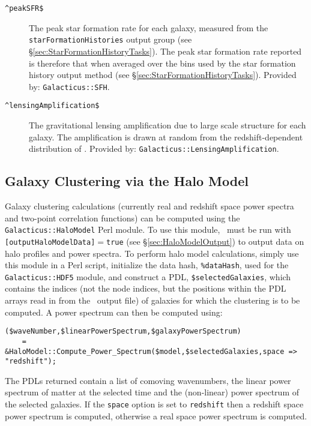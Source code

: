 \begin{description}
 \item[{\tt \textasciicircum peakSFR\$}] The peak star formation rate for each galaxy, measured from the {\tt starFormationHistories} output group  (see \S\ref{sec:StarFormationHistoryTasks}). The peak star formation rate reported is therefore that when averaged over the bins used by the star formation history output method (see \S\ref{sec:StarFormationHistoryTasks}). Provided by: {\tt Galacticus::SFH}.
 \item[{\tt \textasciicircum lensingAmplification\$}] The gravitational lensing amplification due to large scale structure for each galaxy. The amplification is drawn at random from the redshift-dependent distribution of \cite{takahashi_probability_2011}. Provided by: {\tt Galacticus::LensingAmplification}.
\end{description}

\subsection{Galaxy Clustering via the Halo Model}\label{sec:ClusteringHaloModel}

Galaxy clustering calculations (currently real and redshift space power spectra and two-point correlation functions) can be computed using the {\tt Galacticus::HaloModel} Perl module. To use this module, \glc\ must be run with {\tt [outputHaloModelData]}$=${\tt true} (see \S\ref{sec:HaloModelOutput}) to output data on halo profiles and power spectra. To perform halo model calculations, simply use this module in a Perl script, initialize the data hash, {\tt \%dataHash}, used for the {\tt Galacticus::HDF5} module, and construct a PDL, {\tt \$selectedGalaxies}, which contains the indices (not the node indices, but the positions within the PDL arrays read in from the \glc\ output file) of galaxies for which the clustering is to be computed. A power spectrum can then be computed using:
\begin{verbatim}
($waveNumber,$linearPowerSpectrum,$galaxyPowerSpectrum) 
    = &HaloModel::Compute_Power_Spectrum($model,$selectedGalaxies,space => "redshift");
\end{verbatim}
The PDLs returned contain a list of comoving wavenumbers, the linear power spectrum of matter at the selected time and the (non-linear) power spectrum of the selected galaxies. If the {\tt space} option is set to {\tt redshift} then a redshift space power spectrum is computed, otherwise a real space power spectrum is computed.

